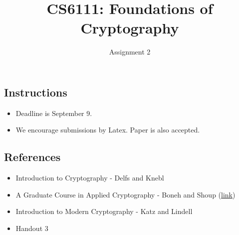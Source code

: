 \documentclass[10pt]{exam}
\title{CS6111: Foundations of Cryptography}
\author{Assignment 2}
\date{}
\begin{document}
\maketitle

\subsection*{Instructions} 
\begin{itemize}
    \item Deadline is September 9.
    \item We encourage submissions by Latex. Paper is also accepted. 
\end{itemize}


\subsection*{References} 
\begin{itemize}\itemsep0em
    \item Introduction to Cryptography - Delfs and Knebl
    \item A Graduate Course in Applied Cryptography - Boneh and Shoup (\href{https://crypto.stanford.edu/~dabo/cryptobook}{link})
    \item Introduction to Modern Cryptography - Katz and Lindell 
    \item Handout 3
\end{itemize}
\end{document}
